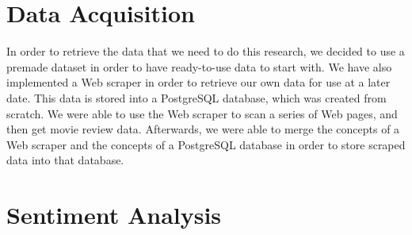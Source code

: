 \documentclass[a0,portrait]{a0poster}
\begin{document}
\begin{multicols}{2}

\section*{Data Acquisition}

In order to retrieve the data that we need to do this research, we decided to use a premade dataset in order to have ready-to-use data to start with.  We have also implemented a Web scraper in order to retrieve our own data for use at a later date.  This data is stored into a PostgreSQL database, which was created from scratch.  We were able to use the Web scraper to scan a series of Web pages, and then get movie review data.  Afterwards, we were able to merge the concepts of a Web scraper and the concepts of a PostgreSQL database in order to store scraped data into that database.


\section*{Sentiment Analysis}


\end{multicols}
\end{document}
